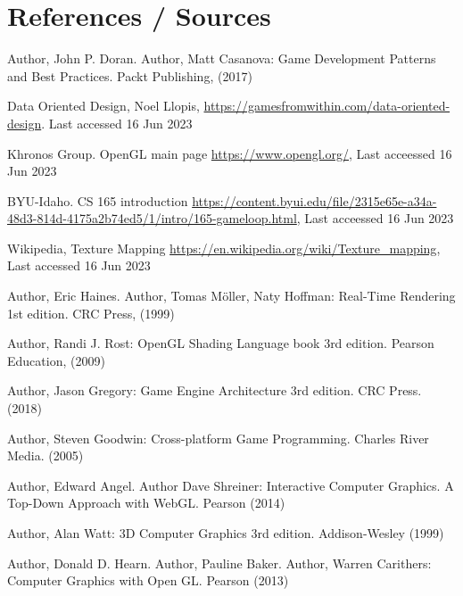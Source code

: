 \documentclass[runningheads, 12pt]{llncs}
\begin{document}
\section{References / Sources}
\begin{thebibliography}{8}

Author, John P. Doran. Author, Matt Casanova: Game Development Patterns and Best Practices. Packt Publishing, (2017)

Data Oriented Design, Noel Llopis, \url{https://gamesfromwithin.com/data-oriented-design}. Last accessed 16
Jun 2023

Khronos Group. OpenGL main page
\url{https://www.opengl.org/}, Last acceessed 16 Jun 2023

BYU-Idaho. CS 165 introduction
\url{https://content.byui.edu/file/2315e65e-a34a-48d3-814d-4175a2b74ed5/1/intro/165-gameloop.html}, Last acceessed 16 Jun 2023

Wikipedia, Texture Mapping
\url{https://en.wikipedia.org/wiki/Texture_mapping}, Last accessed 16 Jun 2023

Author, Eric Haines. Author, Tomas Möller, Naty Hoffman: Real-Time Rendering 1st edition. CRC Press, (1999)

Author,  Randi J. Rost: OpenGL Shading Language book 3rd edition. Pearson Education, (2009)

Author, Jason Gregory: Game Engine Architecture 3rd edition. CRC Press. (2018) 

Author, Steven Goodwin: Cross-platform Game Programming. Charles River Media. (2005) 

Author, Edward Angel. Author Dave Shreiner: Interactive Computer Graphics. A Top-Down Approach with WebGL. Pearson (2014)

Author, Alan Watt: 3D Computer Graphics 3rd edition. Addison-Wesley (1999)

Author, Donald D. Hearn. Author, Pauline Baker. Author, Warren Carithers: Computer Graphics with Open GL. Pearson (2013)



\end{thebibliography}
\end{document}
